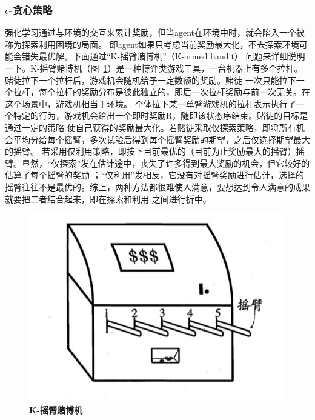 \subsubsection{$\epsilon$-贪心策略}
强化学习通过与环境的交互来累计奖励，但当agent在环境中时，就会陷入一个被称为探索利用困境的局面。
即agent如果只考虑当前奖励最大化，不去探索环境可能会错失最优解。下面通过“K-摇臂赌博机”（K-armed bandit）
问题来详细说明一下。K-摇臂赌博机（图~\ref{fig:3_2}）是一种博弈类游戏工具，一台机器上有多个拉杆。赌徒拉下一个拉杆后，游戏机会随机给予一定数额的奖励。赌徒
一次只能拉下一个拉杆，每个拉杆的奖励分布是彼此独立的，即后一次拉杆奖励与前一次无关。在这个场景中，游戏机相当于环境。
个体拉下某一单臂游戏机的拉杆表示执行了一个特定的行为，游戏机会给出一个即时奖励R，随即该状态序结束。赌徒的目标是通过一定的策略
使自己获得的奖励最大化。若赌徒采取仅探索策略，即将所有机会平均分给每个摇臂，多次试验后得到每个摇臂奖励的期望，之后仅选择期望最大的摇臂。
若采用仅利用策略，即按下目前最优的（目前为止奖励最大的摇臂）摇臂。显然，“仅探索”发在估计途中，丧失了许多得到最大奖励的机会，但它较好的估算了每个摇臂的奖励
；“仅利用”发相反，它没有对摇臂奖励进行估计，选择的摇臂往往不是最优的。综上，两种方法都很难使人满意，要想达到令人满意的成果就要把二者结合起来，即在探索和利用
之间进行折中。
\begin{figure}[H]
  \centering
  \includegraphics[width=0.6\linewidth]{fig/kab.jpg}
  \caption{\textbf{K-摇臂赌博机}}
  \label{fig:3_2}
\end{figure}

